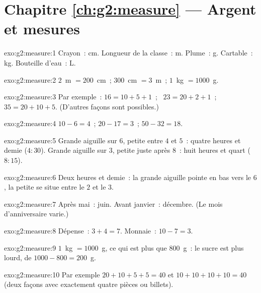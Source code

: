 \section*{Chapitre \ref{ch:g2:measure} --- Argent et mesures}

\begin{solution}{exo:g2:measure:1}
Crayon~: cm. Longueur de la classe~: m. Plume~: g. Cartable~: kg.
Bouteille d'eau~: L.
\end{solution}

\begin{solution}{exo:g2:measure:2}
$2$~m $= 200$~cm~; \quad $300$~cm $= 3$~m~; \quad $1$~kg $= 1000$~g.
\end{solution}

\begin{solution}{exo:g2:measure:3}
Par exemple~: $16 = 10 + 5 + 1$~; \ $23 = 20 + 2 + 1$~; \
$35 = 20 + 10 + 5$. (D'autres façons sont possibles.)
\end{solution}

\begin{solution}{exo:g2:measure:4}
$10 - 6 = 4$~; \quad $20 - 17 = 3$~; \quad $50 - 32 = 18$.
\end{solution}

\begin{solution}{exo:g2:measure:5}
Grande aiguille sur $6$, petite entre $4$ et $5$~: quatre heures et
demie ($4{:}30$). Grande aiguille sur $3$, petite juste après
$8$~: huit heures et quart ($8{:}15$).
\end{solution}

\begin{solution}{exo:g2:measure:6}
Deux heures et demie~: la grande aiguille pointe en bas vers le $6$,
la petite se situe entre le $2$ et le $3$.
\end{solution}

\begin{solution}{exo:g2:measure:7}
Après mai~: juin. Avant janvier~: décembre. (Le mois
d'anniversaire varie.)
\end{solution}

\begin{solution}{exo:g2:measure:8}
Dépense~: $3 + 4 = 7$. Monnaie~: $10 - 7 = 3$.
\end{solution}

\begin{solution}{exo:g2:measure:9}
$1$~kg $= 1000$~g, ce qui est plus que $800$~g~: le sucre est plus
lourd, de $1000 - 800 = 200$~g.
\end{solution}

\begin{solution}{exo:g2:measure:10}
Par exemple $20 + 10 + 5 + 5 = 40$ et $10 + 10 + 10 + 10 = 40$ (deux
façons avec exactement quatre pièces ou billets).
\end{solution}
